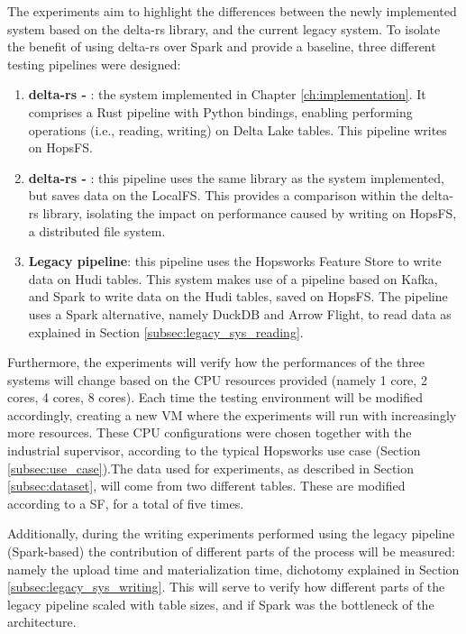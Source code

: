 The experiments aim to highlight the differences between the newly implemented system based on the delta-rs library, and the current legacy system. To isolate the benefit of using delta-rs over Spark and provide a baseline, three different testing pipelines were designed:
\begin{enumerate}
    \item \textbf{delta-rs - }: the system implemented in Chapter \ref{ch:implementation}. It comprises a Rust pipeline with Python bindings, enabling performing operations (i.e., reading, writing) on Delta Lake tables. This pipeline writes on \gls{HopsFS}.
    \item \textbf{delta-rs - }: this pipeline uses the same library as the system implemented, but saves data on the \gls{LocalFS}. This provides a comparison within the delta-rs library, isolating the impact on performance caused by writing on \gls{HopsFS}, a distributed file system.
    \item \textbf{Legacy pipeline}: this pipeline uses the Hopsworks Feature Store to write data on Hudi tables. This system makes use of a pipeline based on Kafka, and Spark to write data on the Hudi tables, saved on \gls{HopsFS}. The pipeline uses a Spark alternative, namely DuckDB and Arrow Flight, to read data as explained in Section \ref{subsec:legacy_sys_reading}. 
\end{enumerate}

Furthermore, the experiments will verify how the performances of the three systems will change based on the \gls{CPU} resources provided (namely 1 core, 2 cores, 4 cores, 8 cores). Each time the testing environment will be modified accordingly, creating a new \gls{VM} where the experiments will run with increasingly more resources. These \gls{CPU} configurations were chosen together with the industrial supervisor, according to the typical Hopsworks use case (Section \ref{subsec:use_case}).The data used for experiments, as described in Section \ref{subsec:dataset}, will come from two different tables. These are modified according to a \gls{SF}, for a total of five times. 

Additionally, during the writing experiments performed using the legacy pipeline (Spark-based) the contribution of different parts of the process will be measured: namely the upload time and materialization time, dichotomy explained in Section \ref{subsec:legacy_sys_writing}. This will serve to verify how different parts of the legacy pipeline scaled with table sizes, and if Spark was the bottleneck of the architecture.

